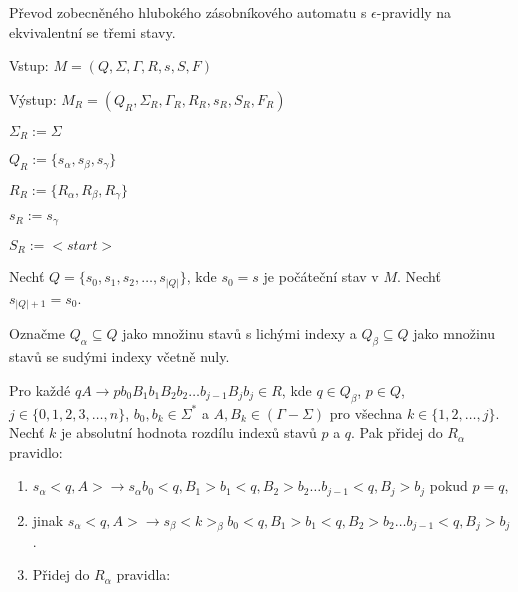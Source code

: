\begin{Alg}
Převod zobecněného hlubokého zásobníkového automatu s $\epsilon$-pravidly na ekvivalentní se třemi stavy.

\begin{list}{}{\setlength\parsep{0cm} \setlength\itemsep{0cm} \setlength\leftmargin{1em}}
   \item Vstup: $M = (Q,\Sigma,\Gamma, R, s, S, F)$ 
   \item Výstup: $M_{R} = (Q_{R}, \Sigma_{R}, {\Gamma}_{R}, R_{R}, s_{R},  S_{R}, F_{R})$ \medskip
    
   \item ${\Sigma}_{R} := \Sigma$
   \item $Q_{R} := \{s_\alpha, s_\beta, s_\gamma \}$
   \item $R_{R} := \{R_{\alpha}, R_{\beta}, R_{\gamma} \}$
   \item $s_{R} := s_{\gamma} $
   \item $S_{R} := <start> $ \medskip

   \item Nechť $Q = \{s_0, s_1, s_2, \dots,s_{|Q|}\}$, kde $s_0 = s$ je počáteční stav v $M$. Nechť $s_{|Q|+1} = s_0$.
   \item Označme $Q_\alpha \subseteq Q$ jako množinu stavů s lichými indexy a $Q_\beta \subseteq Q$ jako množinu stavů se sudými indexy včetně nuly. \medskip

   \item Pro každé $qA \rightarrow p b_0 B_1 b_1 B_2 b_2 \dots b_{j-1} B_{j} b_j \in R$, kde $q \in Q_\beta$, $p \in Q$, $j \in \{0,1,2,3,\dots,n\}$, $b_0,b_k \in {\Sigma}^*$ a $A, B_k \in (\Gamma - \Sigma)$ pro všechna $k \in \{1,2,\dots,j\}$. 
         Nechť $k$ je absolutní hodnota rozdílu indexů stavů $p$ a $q$. 
         Pak přidej do $R_\alpha$ pravidlo:


\begin{enumerate}
\renewcommand{\labelenumi}{(\roman{enumi})}

   \item  $s_\alpha <q, A> \rightarrow s_\alpha b_0 <q, B_1> b_1 <q, B_2> b_2 \dots b_{j-1} <q, B_j> b_j$ pokud $p = q$,
   \item jinak $s_\alpha <q, A> \rightarrow s_\beta <k>_\beta b_0 <q, B_1> b_1 <q, B_2> b_2 \dots b_{j-1} <q, B_j> b_j$. 


   \item Přidej do $R_\alpha$ pravidla:

\renewcommand{\labelenumi}{(\roman{enumi})}


\end{enumerate}
\end{list}
\end{Alg}
